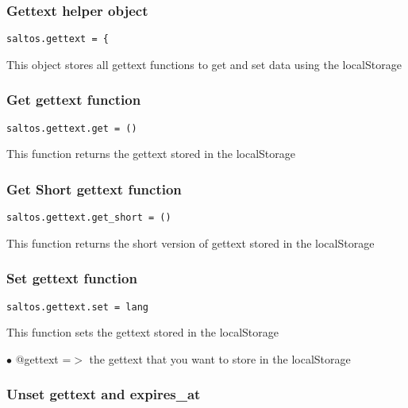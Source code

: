 \documentclass[a4paper]{article}
\begin{document}
\hypertarget{toc794}{}
\subsubsection{Gettext helper object}

\begin{lstlisting}
saltos.gettext = {
\end{lstlisting}

This object stores all gettext functions to get and set data using the localStorage

\hypertarget{toc795}{}
\subsubsection{Get gettext function}

\begin{lstlisting}
saltos.gettext.get = ()
\end{lstlisting}

This function returns the gettext stored in the localStorage

\hypertarget{toc796}{}
\subsubsection{Get Short gettext function}

\begin{lstlisting}
saltos.gettext.get_short = ()
\end{lstlisting}

This function returns the short version of gettext stored in the localStorage

\hypertarget{toc797}{}
\subsubsection{Set gettext function}

\begin{lstlisting}
saltos.gettext.set = lang
\end{lstlisting}

This function sets the gettext stored in the localStorage

\begin{compactitem}
\item[\color{myblue}$\bullet$] @gettext      =$>$ the gettext that you want to store in the localStorage
\end{compactitem}

\hypertarget{toc798}{}
\subsubsection{Unset gettext and expires\_at}
\end{document}
